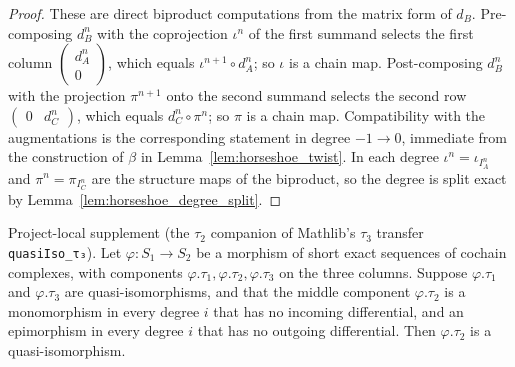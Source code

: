 \begin{proof}
  These are direct biproduct computations from the matrix form of \(d_B\). Pre-composing
  \(d_B^n\) with the coprojection \(\iota^n\) of the first summand selects the first
  column \(\begin{pmatrix} d_A^n \\ 0\end{pmatrix}\), which equals
  \(\iota^{n+1} \circ d_A^n\); so \(\iota\) is a chain map. Post-composing \(d_B^n\) with
  the projection \(\pi^{n+1}\) onto the second summand selects the second row
  \(\begin{pmatrix} 0 & d_C^n\end{pmatrix}\), which equals \(d_C^n \circ \pi^n\); so
  \(\pi\) is a chain map. Compatibility with the augmentations is the corresponding
  statement in degree \(-1 \to 0\), immediate from the construction of \(\beta\) in
  Lemma~\ref{lem:horseshoe_twist}. In each degree \(\iota^n = \iota_{I_A^n}\) and
  \(\pi^n = \pi_{I_C^n}\) are the structure maps of the biproduct, so the degree is split
  exact by Lemma~\ref{lem:horseshoe_degree_split}.
\end{proof}

\begin{lemma}
  \label{lem:quasiIso_tau2}
  Project-local supplement (the \(\tau_2\) companion of Mathlib's \(\tau_3\) transfer
  \texttt{quasiIso\_τ₃}). Let \(\varphi : S_1 \to S_2\) be a morphism of short exact
  sequences of cochain complexes, with components \(\varphi.\tau_1, \varphi.\tau_2,
  \varphi.\tau_3\) on the three columns. Suppose \(\varphi.\tau_1\) and \(\varphi.\tau_3\)
  are quasi-isomorphisms, and that the middle component \(\varphi.\tau_2\) is a
  monomorphism in every degree \(i\) that has no incoming differential, and an
  epimorphism in every degree \(i\) that has no outgoing differential. Then
  \(\varphi.\tau_2\) is a quasi-isomorphism.
\end{lemma}

